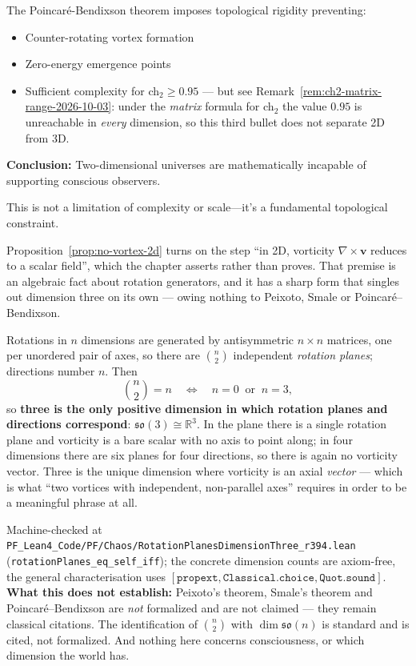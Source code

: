 \begin{keyidea}
The Poincaré-Bendixson theorem imposes topological rigidity preventing:
\begin{itemize}
\item Counter-rotating vortex formation
\item Zero-energy emergence points
\item Sufficient complexity for ch$_2 \geq 0.95$ --- but see
Remark~\ref{rem:ch2-matrix-range-2026-10-03}: under the \emph{matrix} formula for
ch$_2$ the value $0.95$ is unreachable in \emph{every} dimension, so this third
bullet does not separate 2D from 3D.
\end{itemize}

\textbf{Conclusion:} Two-dimensional universes are mathematically incapable of supporting conscious observers.

This is not a limitation of complexity or scale—it's a fundamental topological constraint.
\end{keyidea}

\begin{remark}
\label{rem:rotation-planes-three}
Proposition~\ref{prop:no-vortex-2d} turns on the step ``in 2D, vorticity
$\nabla \times \mathbf{v}$ reduces to a scalar field'', which the chapter asserts
rather than proves. That premise is an algebraic fact about rotation generators,
and it has a sharp form that singles out dimension three on its own --- owing
nothing to Peixoto, Smale or Poincar\'e--Bendixson.

Rotations in $n$ dimensions are generated by antisymmetric $n \times n$
matrices, one per unordered pair of axes, so there are $\binom{n}{2}$
independent \emph{rotation planes}; directions number $n$. Then
\[
\binom{n}{2} = n \quad \Longleftrightarrow \quad n = 0 \ \text{ or } \ n = 3 ,
\]
so \textbf{three is the only positive dimension in which rotation planes and
directions correspond}: $\mathfrak{so}(3) \cong \mathbb{R}^3$. In the plane
there is a single rotation plane and vorticity is a bare scalar with no axis to
point along; in four dimensions there are six planes for four directions, so
there is again no vorticity vector. Three is the unique dimension where
vorticity is an axial \emph{vector} --- which is what ``two vortices with
independent, non-parallel axes'' requires in order to be a meaningful phrase at
all.

Machine-checked at
\texttt{PF\_Lean4\_Code/PF/Chaos/RotationPlanesDimensionThree\_r394.lean}
(\texttt{rotationPlanes\_eq\_self\_iff}); the concrete dimension counts are
axiom-free, the general characterisation uses
$[\texttt{propext}, \texttt{Classical.choice}, \texttt{Quot.sound}]$.
\textbf{What this does not establish:} Peixoto's theorem, Smale's theorem and
Poincar\'e--Bendixson are \emph{not} formalized and are not claimed --- they
remain classical citations. The identification of $\binom{n}{2}$ with
$\dim \mathfrak{so}(n)$ is standard and is cited, not formalized. And nothing
here concerns consciousness, or which dimension the world has.
\end{remark}

